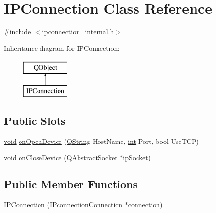 \hypertarget{class_i_p_connection}{\section{I\-P\-Connection Class Reference}
\label{class_i_p_connection}
}


{\ttfamily \#include $<$ipconnection\-\_\-internal.\-h$>$}

Inheritance diagram for I\-P\-Connection\-:\begin{figure}[H]
\begin{center}
\leavevmode
\includegraphics[height=2.000000cm]{class_i_p_connection}
\end{center}
\end{figure}
\subsection*{Public Slots}
\begin{DoxyCompactItemize}
\item 
\hyperlink{group___u_a_v_objects_plugin_ga444cf2ff3f0ecbe028adce838d373f5c}{void} \hyperlink{group___i_p_conn_plugin_ga2620fdde71bd8399a44eeec513197962}{on\-Open\-Device} (\hyperlink{group___u_a_v_objects_plugin_gab9d252f49c333c94a72f97ce3105a32d}{Q\-String} Host\-Name, \hyperlink{ioapi_8h_a787fa3cf048117ba7123753c1e74fcd6}{int} Port, bool Use\-T\-C\-P)
\item 
\hyperlink{group___u_a_v_objects_plugin_ga444cf2ff3f0ecbe028adce838d373f5c}{void} \hyperlink{group___i_p_conn_plugin_gac260d56bd7a0226cc1c047062b705314}{on\-Close\-Device} (Q\-Abstract\-Socket $\ast$ip\-Socket)
\end{DoxyCompactItemize}
\subsection*{Public Member Functions}
\begin{DoxyCompactItemize}
\item 
\hyperlink{group___i_p_conn_plugin_gac181aa5d3b59b0fab84380bea813691c}{I\-P\-Connection} (\hyperlink{class_i_pconnection_connection}{I\-Pconnection\-Connection} $\ast$\hyperlink{group___i_p_conn_plugin_ga75cb9b33b52928c030806876f2c2f439}{connection})
\end{DoxyCompactItemize}


